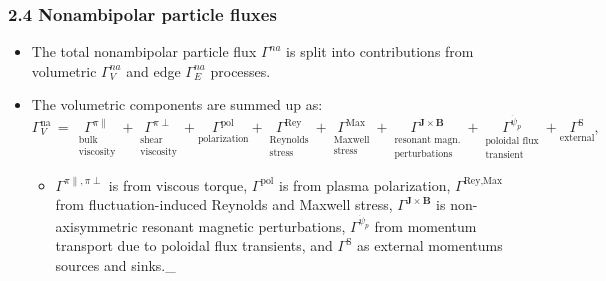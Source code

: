 \documentclass[]{article}
\begin{document}
\subsubsection{2.4 Nonambipolar particle
fluxes}\label{nonambipolar-particle-fluxes}

\begin{itemize}
\item
  The total nonambipolar particle flux \(\Gamma^{na}\) is split into
  contributions from volumetric \(\Gamma_V^{na}\) and edge
  \(\Gamma_E^{na}\) processes.
\item
  The volumetric components are summed up as:
  \[\Gamma_V^\text{na} \,=\, \underset{\substack{\text{bulk} \\ \text{viscosity}}}{\Gamma^{\pi \parallel}} + \underset{\substack{\text{shear} \\ \text{viscosity}}}{\Gamma^{\pi \perp}} + \underset{\text{polarization}}{\Gamma^\text{pol}} + \underset{\substack{\text{Reynolds} \\ \text{stress}}}{\Gamma^\text{Rey}} + \underset{\substack{\text{Maxwell} \\ \text{stress}}}{\Gamma^\text{Max}} + \underset{\substack{\text{resonant magn.} \\ \text{perturbations}}}{\Gamma^{\mathbf{J}\times\mathbf{B}}} + \underset{\substack{\text{poloidal flux} \\ \text{transient}}}{\Gamma^{\dot{\psi}_p}} + \underset{\text{external}}{\Gamma^\text{S}},\]

  \begin{itemize}
  \item
    \(\Gamma^{\pi\parallel, \pi \perp}\) is from viscous torque,
    \(\Gamma^\text{pol}\) is from plasma polarization,
    \(\Gamma^\text{Rey,Max}\) from fluctuation-induced Reynolds and
    Maxwell stress, \(\Gamma^{\mathbf{J}\times\mathbf{B}}\) is
    non-axisymmetric resonant magnetic perturbations,
    \(\Gamma^{\dot{\psi}_p}\) from momentum transport due to poloidal
    flux transients, and \(\Gamma^\text{S}\) as external momentums
    sources and sinks.\_


\end{itemize}
\end{itemize}
\end{document}
